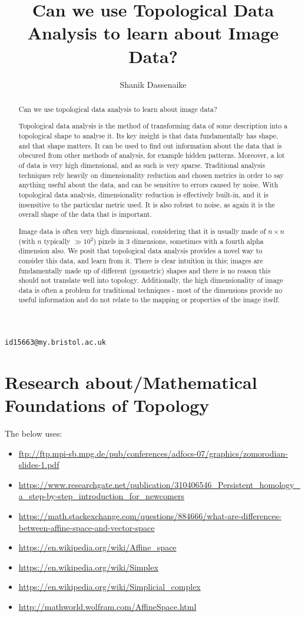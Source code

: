 \documentclass[a4paper]{article}
\title{Can we use Topological Data Analysis to learn about Image Data?}
\author{Shanik Dassenaike}
\begin{document}
\maketitle
\texttt{id15663@my.bristol.ac.uk}

\begin{abstract}
Can we use topological data analysis to learn about image data? 

Topological data analysis is the method of transforming data of some description into a topological shape to analyse it. Its key insight is that data fundamentally has shape, and that shape matters. It can be used to find out information about the data that is obscured from other methods of analysis, for example hidden patterns. Moreover, a lot of data is very high dimensional, and as such is very sparse. Traditional analysis techniques rely heavily on dimensionality reduction and chosen metrics in order to say anything useful about the data, and can be sensitive to errors caused by noise. With topological data analysis, dimensionality reduction is effectively built-in, and it is insensitive to the particular metric used. It is also robust to noise, as again it is the overall shape of the data that is important.

Image data is often very high dimensional, considering that it is usually made of $n \times n$ (with $n$ typically $\gg 10^{2}$) pixels in 3 dimensions, sometimes with a fourth alpha dimension also. We posit that topological data analysis provides a novel way to consider this data, and learn from it. There is clear intuition in this; images are fundamentally made up of different (geometric) shapes and there is no reason this should not translate well into topology. Additionally, the high dimensionality of image data is often a problem for traditional techniques - most of the dimensions provide no useful information and do not relate to the mapping or properties of the image itself.

\end{abstract}

\section*{Research about/Mathematical Foundations of Topology}
The below uses:
\begin{itemize}
\item \url{ftp://ftp.mpi-sb.mpg.de/pub/conferences/adfocs-07/graphics/zomorodian-slides-1.pdf}
\item \url{https://www.researchgate.net/publication/310406546_Persistent_homology_a_step-by-step_introduction_for_newcomers}
\item \url{https://math.stackexchange.com/questions/884666/what-are-differences-between-affine-space-and-vector-space}
\item \url{https://en.wikipedia.org/wiki/Affine_space}
\item \url{https://en.wikipedia.org/wiki/Simplex}
\item \url{https://en.wikipedia.org/wiki/Simplicial_complex}
\item \url{http://mathworld.wolfram.com/AffineSpace.html}
\end{itemize}
\end{document}
